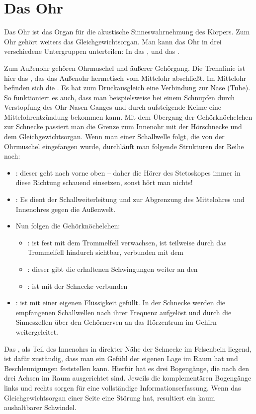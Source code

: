 \section{Das Ohr}
\label{topic:ohr} 

{%
Das Ohr ist das Organ für die akustische
Sinneswahrnehmung des Körpers. Zum Ohr gehört weiters das
Gleichgewichtsorgan.
Man kann das Ohr in drei verschiedene Untergruppen
unterteilen: In das ,  und das 
.

Zum Außenohr gehören Ohrmuschel und äußerer Gehörgang. Die
Trennlinie ist hier das , das das Außenohr
hermetisch vom Mittelohr abschließt. Im Mittelohr befinden
sich die . Es hat zum Druckausgleich
eine Verbindung zur Nase (Tube). So funktioniert es auch,
dass man beispielsweise bei einem Schnupfen durch Verstopfung des
Ohr-Nasen-Ganges und durch aufsteigende Keime eine
Mittelohrentzündung bekommen kann. Mit dem Übergang der
Gehörknöchelchen zur Schnecke passiert man die Grenze zum
Innenohr mit der Hörschnecke  und dem
Gleichgewichtsorgan. 
Wenn man einer Schallwelle folgt, die von der Ohrmuschel
eingefangen wurde, durchläuft man folgende Strukturen der
Reihe nach:
\begin{itemize}
  \item {}: dieser geht nach vorne oben
  -- daher die Hörer des Stetoskopes immer in diese Richtung
  schauend einsetzen, sonst hört man
  nichts!
  \item {}: Es dient der Schallweiterleitung
  und zur Abgrenzung des Mittelohres und Innenohres gegen die Außenwelt.
  \item Nun folgen die Gehörknöchelchen:
  \begin{itemize}
    \item {} : ist fest mit dem
    Trommelfell verwachsen, ist teilweise durch das
    Trommelfell hindurch sichtbar, verbunden mit dem
    \item {} : dieser gibt die erhaltenen
    Schwingungen weiter an den
    \item {} : ist mit der Schnecke
    verbunden
  \end{itemize}
  \item {} : ist mit einer eigenen
  Flüssigkeit gefüllt. In der Schnecke werden die
  empfangenen Schallwellen nach ihrer Frequenz aufgelöst und
  durch die Sinneszellen über den Gehörnerven an das
  Hörzentrum im Gehirn weitergeleitet.
\end{itemize}
Das , als Teil des Innenohrs in
direkter Nähe der Schnecke im Felsenbein liegend, ist dafür
zuständig, dass man ein Gefühl der eigenen Lage im Raum hat
und Beschleunigungen feststellen kann. Hierfür hat es drei
Bogengänge, die nach den drei Achsen im Raum ausgerichtet
sind. Jeweils die komplementären Bogengänge links und rechts
sorgen für eine vollständige Informationserfassung. Wenn das
Gleichgewichtsorgan einer Seite eine Störung hat, resultiert
ein kaum aushaltbarer Schwindel.
}
